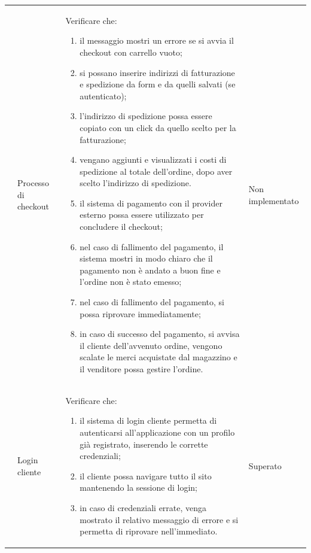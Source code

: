 \begin{center}
\begin{longtable}{|p{0.85cm}|p{2.25cm}|p{9cm}|p{3cm}|}
		 & Processo di checkout & Verificare che:
		\begin{enumerate}
			\item il messaggio mostri un errore se si avvia il checkout con carrello vuoto;
			\item si possano inserire indirizzi di fatturazione e spedizione da form e da quelli salvati (se autenticato);
			\item l'indirizzo di spedizione possa essere copiato con un click da quello scelto per la fatturazione;
			\item vengano aggiunti e visualizzati i costi di spedizione al totale dell'ordine, dopo aver scelto l'indirizzo di spedizione. 
			\item il sistema di pagamento con il provider esterno possa essere utilizzato per concludere il checkout;
			\item nel caso di fallimento del pagamento, il sistema mostri in modo chiaro che il pagamento non è andato a buon fine e l'ordine non è stato emesso;
			\item nel caso di fallimento del pagamento, si possa riprovare immediatamente;
			\item in caso di successo del pagamento, si avvisa il cliente dell'avvenuto ordine, vengono scalate le merci acquistate dal magazzino e il venditore possa gestire l'ordine.
		\end{enumerate} & Non implementato\\

		 & Login cliente & Verificare che:
		\begin{enumerate}
			\item il sistema di login cliente permetta di autenticarsi all'applicazione con un profilo già registrato, inserendo le corrette credenziali;
			\item il cliente possa navigare tutto il sito mantenendo la sessione di login;
			\item in caso di credenziali errate, venga mostrato il relativo messaggio di errore e si permetta di riprovare nell'immediato.
		\end{enumerate} & Superato\\


\end{longtable}
\end{center}
